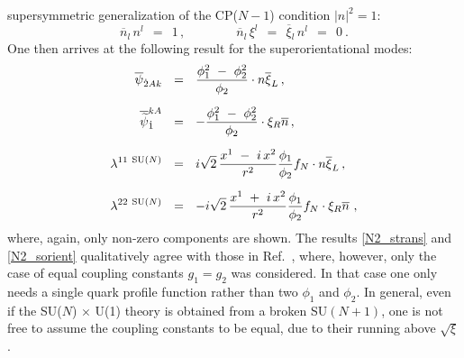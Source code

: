 \documentclass[12pt]{article}
\def\beq{\begin{equation}}
\def\eeq{\end{equation}}
\newcommand{\wt}{\widetilde}
\newcommand{\ov}{\overline}
\newcommand{\sunu}{{\rm SU($N$) $\times$ U(1)} }
\newcommand{\nbar}{\ov{n}}
\begin{document}
	supersymmetric generalization of the CP($N-1$) condition $ |n|^2 = 1 $:
\beq
\label{constr}
	\nbar{}_l\, n^l ~~=~~ 1\,, \qquad\qquad    \nbar_l\, \xi^l  ~~=~~ \ov{\xi}{}_l\, n^l  ~~=~~ 0~.
\eeq
	One then arrives at the following result for the superorientational modes:
\begin{align}
\label{N2_sorient}
%
\notag
\overline{\psi}_{\dot{2}Ak} & ~~=~~ \frac{\phi_1^2 ~-~ \phi_2^2}{\phi_2} \cdot n \overline{\xi}_L  \,,
 \\[2mm]
%
\notag
\overline{\wt{\psi}}_{\dot{1}}^{kA}  & ~~=~~ - \frac{\phi_1^2 ~-~ \phi_2^2}{\phi_2} \cdot \xi_R \nbar \,, \\[2mm]
%
\lambda^{11\ \text{SU($N$)}} & ~~=~~ i \sqrt{2}\, \frac{ x^1 ~-~ i\, x^2 }{r^2} 
						  \frac{\phi_1}{\phi_2} f_N \cdot n \overline{\xi}_L \,,\\[2mm]
%
\notag
\lambda^{22\ \text{SU($N$)}} & ~~=~~ - i \sqrt{2}\, \frac{ x^1 ~+~ i\, x^2 }{r^2} 
						    \frac{\phi_1}{\phi_2} f_N \cdot \xi_R \nbar 
	~,
\end{align}
	where, again, only non-zero components are shown. 
	The results \eqref{N2_strans} and \eqref{N2_sorient} qualitatively agree with those in Ref.~\cite{Edalati},
	where, however, only the case of equal coupling constants $ g_1 = g_2 $ was considered.
	In that case one only needs a single quark profile function rather than two $ \phi_1 $ and $ \phi_2 $.
	In general, even if the \sunu theory is obtained from a broken SU$ (N+1) $, 
	one is not free to assume the coupling constants to be equal, due to their running above $ \sqrt{\xi} $.
\end{document}
